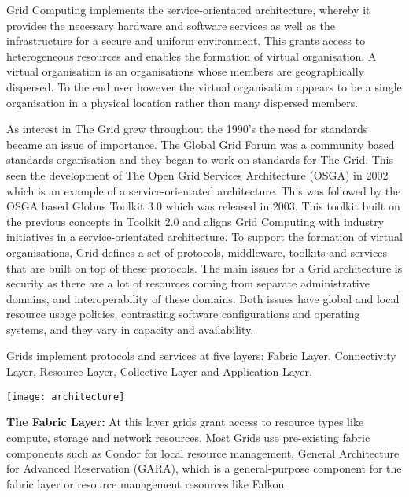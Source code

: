 \documentclass[10pt,journal,compsoc]{IEEEtran}
\begin{document}
\hspace{-0.5cm}Grid Computing implements the service-orientated architecture, whereby it provides the necessary hardware and software services as well as the infrastructure for a secure and uniform environment. This grants access to heterogeneous resources and enables the formation of virtual organisation. \cite{book} A virtual organisation is an organisations whose members are geographically dispersed. To the end user however the virtual organisation appears to be a single organisation in a physical location rather than many dispersed members. \newline

\hspace{-0.5cm}As interest in The Grid grew throughout the 1990's the need for standards became an issue of importance. The Global Grid Forum was a community based standards organisation and they began to work on standards for The Grid. This seen the development of The Open Grid Services Architecture (OSGA) in 2002 which is an example of a service-orientated architecture. \cite{services} This was followed by the OSGA based Globus Toolkit 3.0 which was released in 2003. This toolkit built on the previous concepts in Toolkit 2.0 and aligns Grid Computing with industry initiatives in a service-orientated architecture. \cite{GridNutShell} To support the formation of virtual organisations, Grid defines a set of protocols, middleware, toolkits and services that are built on top of these protocols. The main issues for a Grid architecture is security as there are a lot of resources coming from separate administrative domains, and interoperability of these domains. Both issues have global and local resource usage policies, contrasting software configurations and operating systems, and they vary in capacity and availability. \cite{GridAndCloud} \newline

\hspace{-0.5cm}Grids implement protocols and services at five layers: 
Fabric Layer, Connectivity Layer, Resource Layer, Collective Layer and Application Layer. \newline

\texttt{[image: architecture]}

\hspace{-0.5cm}\newline\textbf{The Fabric Layer: }At this layer grids grant access to resource types like compute, storage and network resources. Most Grids use pre-existing fabric components such as Condor for local resource management, General Architecture for Advanced Reservation (GARA), which is a general-purpose component for the fabric layer or resource management resources like Falkon. \newline
\end{document}
